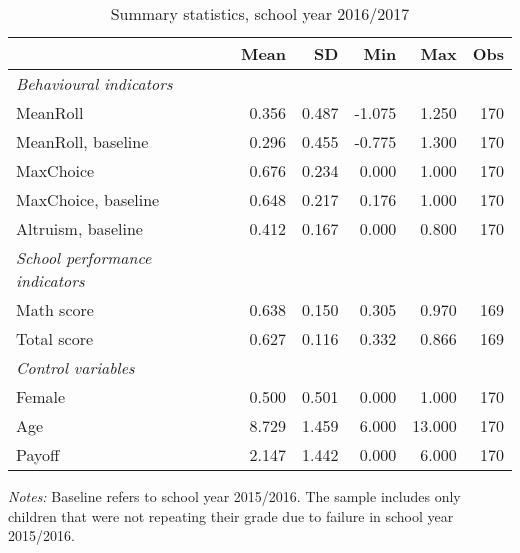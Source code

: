 \begin{table} \centering
	\caption{Summary statistics, school year 2016/2017}
	\begin{threeparttable}
		\centering
		\begin{tabular}{l*{5}{D{.}{.}{-1}}} 
			\toprule
	&       Mean&          SD&      Min 	&		Max			& Obs	\\
			\toprule			
\textit{Behavioural indicators} &&&&& \\
MeanRoll            &       0.356&       0.487&      -1.075&       1.250&         170\\
MeanRoll, baseline  &       0.296&       0.455&      -0.775&       1.300&         170\\
MaxChoice           &       0.676&       0.234&       0.000&       1.000&         170\\
MaxChoice, baseline &       0.648&       0.217&       0.176&       1.000&         170\\
Altruism, baseline  &       0.412&       0.167&       0.000&       0.800&         170\\ 
\midrule
\textit{School performance indicators} &&&&& \\
Math score          &       0.638&       0.150&       0.305&       0.970&         169\\
Total score         &       0.627&       0.116&       0.332&       0.866&         169\\
\midrule
\textit{Control variables} &&&&& \\ 
Female              &       0.500&       0.501&       0.000&       1.000&         170\\
Age                 &       8.729&       1.459&       6.000&      13.000&         170\\
Payoff              &       2.147&       1.442&       0.000&       6.000&         170\\
\bottomrule
\end{tabular}
\begin{tablenotes}
\footnotesize
\textit{Notes:} Baseline refers to school year 2015/2016. The sample includes only children that were not repeating their grade due to failure in school year 2015/2016.
\end{tablenotes}
\end{threeparttable}
\label{tab:sumstat}
\end{table}